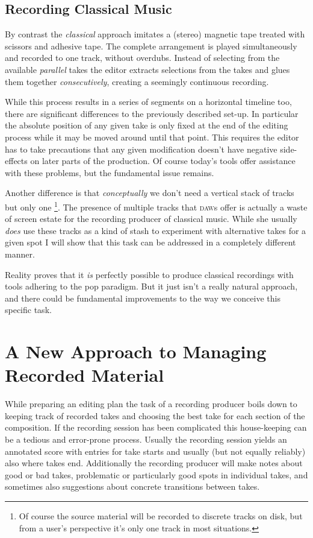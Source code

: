\documentclass[11pt,a4paper]{article}
\begin{document}
\subsection{Recording Classical Music}
 
By contrast the \emph{classical} approach imitates a (stereo) magnetic tape
treated with scissors and adhesive tape.
The complete arrangement is played simultaneously and recorded to one track,
without overdubs.
Instead of selecting from the available \emph{parallel} takes the editor
extracts selections from the takes and glues them together \emph{consecutively},
creating a seemingly continuous recording.

While this process results in a series of segments on a horizontal timeline too,
there are significant differences to the previously described set-up.
In particular the absolute position of any given take is only fixed at
the end of the editing process while it may be moved around until that point.
This requires the editor has to take precautions that any given modification
doesn't have negative side-effects on later parts of the production.
Of course today's tools offer assistance with these problems, but the fundamental
issue remains.

Another difference is that \emph{conceptually} we don't need a vertical stack of
tracks but only one%
\footnote{Of course the source material will be recorded to discrete tracks on
disk, but from a user's perspective it's only one track in most situations.}.
The presence of multiple tracks that \textsc{daw}s offer is actually a waste of
screen estate for the recording producer of classical music.
While she usually \emph{does} use these tracks as a kind of stash to experiment
with alternative takes for a given spot I will show that this task can be
addressed in a completely different manner.

Reality proves that it \emph{is} perfectly possible to produce classical
recordings with tools adhering to the pop paradigm.
But it just isn't a really natural approach, and there could be fundamental
improvements to the way we conceive this specific task. 

\section{A New Approach to Managing Recorded Material}

While preparing an editing plan the task of a recording producer boils down to
keeping track of recorded takes and choosing the best take for each section of
the composition.
If the recording session has been complicated this house-keeping can be a
tedious and error-prone process.
Usually the recording session yields an annotated score with entries for take
starts and usually (but not equally reliably) also where takes end.
Additionally the recording producer will make notes about good or bad takes,
problematic or particularly good spots in individual takes, and sometimes also
suggestions about concrete transitions between takes.
\end{document}
